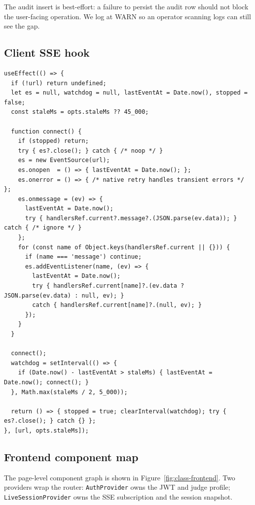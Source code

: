 The audit insert is best-effort: a failure to persist the audit row
should not block the user-facing operation. We log at WARN so an
operator scanning logs can still see the gap.

\subsection{Client SSE hook}

\begin{lstlisting}[caption={\texttt{client/src/hooks/useEventStream.js} (key fragment)},label={lst:hook}]
useEffect(() => {
  if (!url) return undefined;
  let es = null, watchdog = null, lastEventAt = Date.now(), stopped = false;
  const staleMs = opts.staleMs ?? 45_000;

  function connect() {
    if (stopped) return;
    try { es?.close(); } catch { /* noop */ }
    es = new EventSource(url);
    es.onopen  = () => { lastEventAt = Date.now(); };
    es.onerror = () => { /* native retry handles transient errors */ };
    es.onmessage = (ev) => {
      lastEventAt = Date.now();
      try { handlersRef.current?.message?.(JSON.parse(ev.data)); } catch { /* ignore */ }
    };
    for (const name of Object.keys(handlersRef.current || {})) {
      if (name === 'message') continue;
      es.addEventListener(name, (ev) => {
        lastEventAt = Date.now();
        try { handlersRef.current[name]?.(ev.data ? JSON.parse(ev.data) : null, ev); }
        catch { handlersRef.current[name]?.(null, ev); }
      });
    }
  }

  connect();
  watchdog = setInterval(() => {
    if (Date.now() - lastEventAt > staleMs) { lastEventAt = Date.now(); connect(); }
  }, Math.max(staleMs / 2, 5_000));

  return () => { stopped = true; clearInterval(watchdog); try { es?.close(); } catch {} };
}, [url, opts.staleMs]);
\end{lstlisting}

\subsection{Frontend component map}

The page-level component graph is shown in
Figure~\ref{fig:class-frontend}. Two providers wrap the router:
\texttt{AuthProvider} owns the JWT and judge profile; \texttt{LiveSessionProvider}
owns the SSE subscription and the session snapshot.

